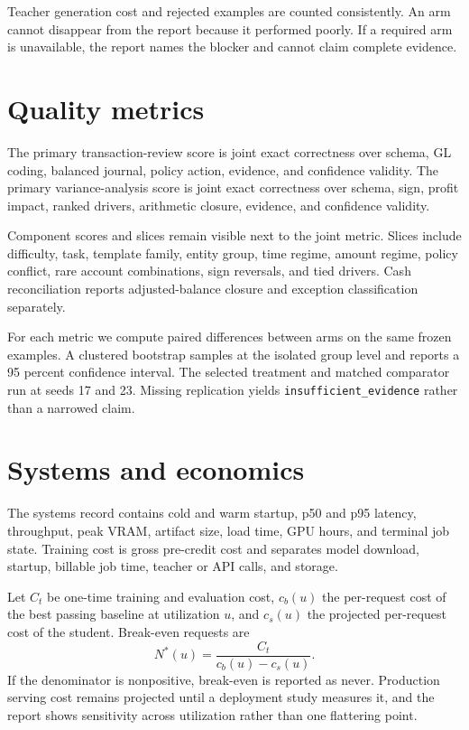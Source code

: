 \documentclass{article}
\begin{document}
Teacher generation cost and rejected examples are counted consistently. An arm cannot disappear from the report because it performed poorly. If a required arm is unavailable, the report names the blocker and cannot claim complete evidence.

\section{Quality metrics}
The primary transaction-review score is joint exact correctness over schema, GL coding, balanced journal, policy action, evidence, and confidence validity. The primary variance-analysis score is joint exact correctness over schema, sign, profit impact, ranked drivers, arithmetic closure, evidence, and confidence validity.

Component scores and slices remain visible next to the joint metric. Slices include difficulty, task, template family, entity group, time regime, amount regime, policy conflict, rare account combinations, sign reversals, and tied drivers. Cash reconciliation reports adjusted-balance closure and exception classification separately.

For each metric we compute paired differences between arms on the same frozen examples. A clustered bootstrap samples at the isolated group level and reports a 95 percent confidence interval. The selected treatment and matched comparator run at seeds 17 and 23. Missing replication yields \texttt{insufficient\_evidence} rather than a narrowed claim.

\section{Systems and economics}
The systems record contains cold and warm startup, p50 and p95 latency, throughput, peak VRAM, artifact size, load time, GPU hours, and terminal job state. Training cost is gross pre-credit cost and separates model download, startup, billable job time, teacher or API calls, and storage.

Let $C_t$ be one-time training and evaluation cost, $c_b(u)$ the per-request cost of the best passing baseline at utilization $u$, and $c_s(u)$ the projected per-request cost of the student. Break-even requests are
\[
N^*(u)=\frac{C_t}{c_b(u)-c_s(u)}.
\]
If the denominator is nonpositive, break-even is reported as never. Production serving cost remains projected until a deployment study measures it, and the report shows sensitivity across utilization rather than one flattering point.
\end{document}
